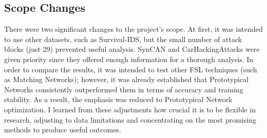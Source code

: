 \subsection{Scope Changes}
\label{subsec:scope}

There were two significant changes to the project's scope. At first, it was intended to use other datasets, such as Survival-IDS, but the small number of attack blocks (just 29) prevented useful analysis. SynCAN and CarHackingAttacks were given priority since they offered enough information for a thorough analysis. In order to compare the results, it was intended to test other FSL techniques (such as Matching Networks); however, it was already established that Prototypical Networks consistently outperformed them in terms of accuracy and training stability. As a result, the emphasis was reduced to Prototypical Network optimization. I learned from these adjustments how crucial it is to be flexible in research, adjusting to data limitations and concentrating on the most promising methods to produce useful outcomes.